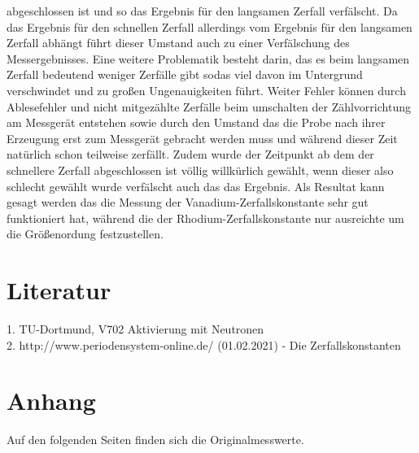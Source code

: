 abgeschlossen ist und so das Ergebnis für den langsamen Zerfall verfälscht. Da das Ergebnis für den schnellen Zerfall
allerdings vom Ergebnis für den langsamen Zerfall abhängt führt dieser Umstand auch zu einer Verfälschung 
des Messergebnisses. Eine weitere Problematik besteht darin, das es beim langsamen Zerfall bedeutend weniger 
Zerfälle gibt sodas viel davon im Untergrund verschwindet und zu großen Ungenauigkeiten führt. Weiter Fehler
können durch Ablesefehler und nicht mitgezählte Zerfälle beim umschalten der Zählvorrichtung am Messgerät
entstehen sowie durch den Umstand das die Probe nach ihrer Erzeugung erst zum Messgerät gebracht werden muss und während
dieser Zeit natürlich schon teilweise zerfällt. Zudem wurde der Zeitpunkt ab dem der schnellere Zerfall abgeschlossen
ist völlig willkürlich gewählt, wenn dieser also schlecht gewählt wurde verfälscht auch das das Ergebnis. Als Resultat kann
gesagt werden das die Messung der Vanadium-Zerfallskonstante sehr gut funktioniert hat, während die der 
Rhodium-Zerfallskonstante nur ausreichte um die Größenordung festzustellen. 



\section{Literatur}
\label{sec:literatur}
1. TU-Dortmund, V702 Aktivierung mit Neutronen\\
2. http://www.periodensystem-online.de/ (01.02.2021) - Die Zerfallskonstanten

\section{Anhang}
\label{sec:anhang}
Auf den folgenden Seiten finden sich die Originalmesswerte.